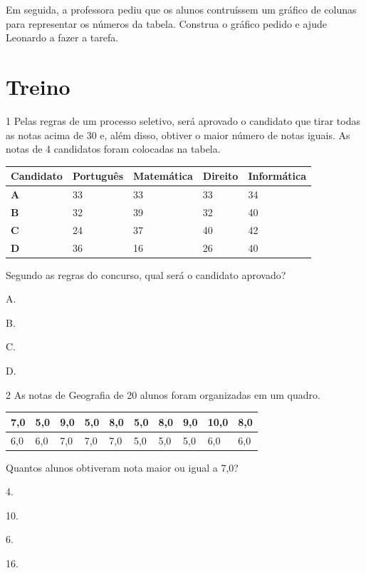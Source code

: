 Em seguida, a professora pediu que os alunos contruíssem um gráfico de
colunas para representar os números da tabela. Construa o gráfico pedido
e ajude Leonardo a fazer a tarefa.

\begin{mdframed}[linewidth=2pt,linecolor=salmao]
\vspace{12cm}
\end{mdframed}

\pagebreak
\section*{Treino}

\num{1} Pelas regras de um processo seletivo, será aprovado 
o candidato que tirar todas as notas acima de 30 e, além disso, obtiver o maior
número de notas iguais. As notas de 4 candidatos foram colocadas na
tabela.

\begin{longtable}[]{@{}lllll@{}}
\toprule
\hline
\textbf{Candidato} & \textbf{Português} & \textbf{Matemática} & \textbf{Direito} &
\textbf{Informática}\tabularnewline
\midrule
\endhead
\textbf{A} & 33 & 33 & 33 & 34\tabularnewline
\hline
\textbf{B} & 32 & 39 & 32 & 40\tabularnewline
\hline
\textbf{C} & 24 & 37 & 40 & 42\tabularnewline
\hline
\textbf{D} & 36 & 16 & 26 & 40\tabularnewline
\hline
\bottomrule
\end{longtable}

Segundo as regras do concurso, qual será o candidato aprovado?

\begin{escolha}
\item
  A.
\item
  B.
\item
  C.
\item
  D.
\end{escolha}


\num{2} As notas de Geografia de 20 alunos foram organizadas em um quadro.

\begin{longtable}[]{@{}llllllllll@{}}
\toprule
7,0 & 5,0 & 9,0 & 5,0 & 8,0 & 5,0 & 8,0 & 9,0 & 10,0 &
8,0\tabularnewline
\midrule
\endhead
6,0 & 6,0 & 7,0 & 7,0 & 7,0 & 5,0 & 5,0 & 5,0 & 6,0 & 6,0\tabularnewline
\bottomrule
\end{longtable}

Quantos alunos obtiveram nota maior ou igual a 7,0?

\begin{multicols}{2}
\begin{escolha}
\item
  4.
\item
  10.
\item
  6.
\item
  16.
\end{escolha}
\end{multicols}

